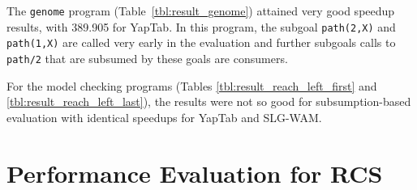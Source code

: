 The \texttt{genome} program (Table~\ref{tbl:result_genome}) attained very good speedup results, with
389.905 for YapTab. In this program, the subgoal \texttt{path(2,X)} and \texttt{path(1,X)} are called
very early in the evaluation and further subgoals calls to \texttt{path/2} that are subsumed by these
goals are consumers.

For the model checking programs (Tables \ref{tbl:result_reach_left_first} and \ref{tbl:result_reach_left_last}),
the results were not so good for subsumption-based evaluation with identical speedups for YapTab and SLG-WAM.





\section{Performance Evaluation for RCS}




